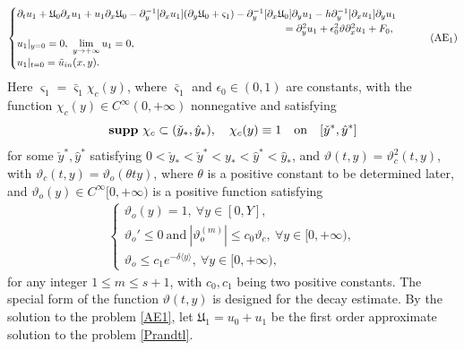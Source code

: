 \documentclass{amsart}
\numberwithin{equation}{section}
\newcommand\y{{{\langle y \rangle}}}
\begin{document}
\begin{equation}\label{AE1}
\begin{cases}
\partial_{t}u_{1}
+\mathfrak{U}_{0}\partial_{x}u_{1}
+u_{1}\partial_{x}\mathfrak{U}_{0}
-\partial_{y}^{-1}[\partial_{x}u_{1}](\partial_{y}\mathfrak{U}_{0}+\varsigma_{1})
-\partial_{y}^{-1}[\partial_{x}\mathfrak{U}_{0}]\partial_{y}u_{1}
-h\partial_{y}^{-1}[\partial_{x}u_{1}]\partial_{y}u_{1}\\
\hspace{3.6in}
=\partial_{y}^{2}u_{1}
+\epsilon_{0}^{2}\vartheta\partial_{x}^{2}u_{1}
+F_{0},\\
u_{1}|_{y=0}=0,~\lim\limits_{y\to+\infty} u_{1}=0,\\
u_{1}|_{t=0}=\tilde{u}_{in}(x,y).
\end{cases}\tag{AE$_{1}$}
\end{equation}
Here $\varsigma_{1}=\bar{\varsigma}_{1}\chi_{c}(y)$, where $\bar{\varsigma}_{1}$ and $\epsilon_{0}\in(0,1)$ are constants,
with the function $\chi_{c}(y)\in C^\infty(0,+\infty)$  nonnegative and satisfying
\begin{equation}\label{chi-c}
 {\bf supp}~\chi_{c} \subset(\check{y}_{*},\hat{y}_{*}), \quad \chi_{c}(y)\equiv 1\quad  {\rm on} \quad [\check{y}^{*},\hat{y}^{*}]
\end{equation}
for some $\check{y}^{*},\hat{y}^{*}$ satisfying $0<\check{y}_{*}<\check{y}^{*}<y_*<\hat{y}^{*}<\hat{y}_{*}$,
and
$\vartheta(t,y)=\vartheta_{c}^{2}(t,y)$, with $\vartheta_{c}(t,y)=\vartheta_{o}(\theta ty)$, where $\theta$ is a positive constant to be determined later, and $\vartheta_{o}(y)\in C^\infty[0,+\infty)$ is a positive function satisfying
\begin{align}\label{theta}
\begin{cases}
\vartheta_{o}(y)=1,~ \forall y\in[0,Y],\\
\vartheta_{o}'\leq 0~\text{and}~|\vartheta_{o}^{(m)}|\leq c_{0}\vartheta_{c},~ \forall y\in [0,+\infty),\\
\vartheta_{o}\leq c_{1}e^{-\delta\y},~ \forall y\in [0,+\infty),
\end{cases}
\end{align}
for any integer $1\leq m\leq s+1$, with $c_{0},c_{1}$ being two positive constants.
The special form of the function $\vartheta(t,y)$ is designed for the decay estimate.
By the solution to the problem \eqref{AE1}, let  $\mathfrak{U}_{1}=u_{0}+u_{1}$ be the first order approximate solution to the problem \eqref{Prandtl}.
\end{document}
